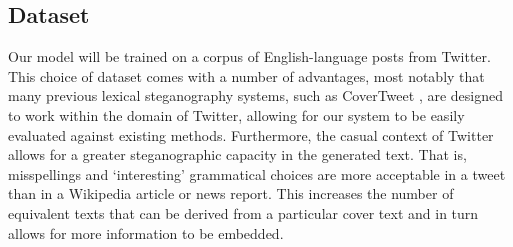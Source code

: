 \documentclass[11pt,a4paper]{article}
\begin{document}
  \subsection *{Dataset}
    Our model will be trained on a corpus of English-language posts from Twitter. This choice of dataset comes with a number of advantages, most notably that many previous lexical steganography systems, such as CoverTweet \cite{covertweet1}, are designed to work within the domain of Twitter, allowing for our system to be easily evaluated against existing methods. Furthermore, the casual context of Twitter allows for a greater steganographic capacity in the generated text. That is, misspellings and `interesting' grammatical choices are more acceptable in a tweet than in a Wikipedia article or news report. This increases the number of equivalent texts that can be derived from a particular cover text and in turn allows for more information to be embedded.
\end{document}
